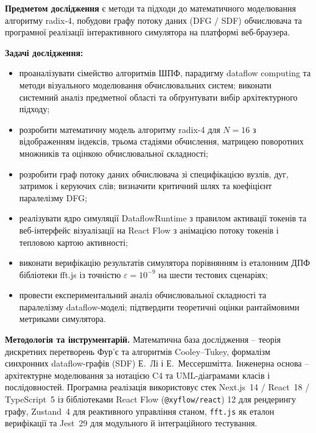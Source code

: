 \documentclass[
]{article}
\begin{document}
\textbf{Предметом дослідження} є методи та підходи до математичного
моделювання алгоритму radix-4, побудови графу потоку даних (DFG / SDF)
обчислювача та програмної реалізації інтерактивного симулятора на
платформі веб-браузера.

\textbf{Задачі дослідження:}

\begin{itemize}
\item
  проаналізувати сімейство алгоритмів ШПФ, парадигму dataflow computing
  та методи візуального моделювання обчислювальних систем; виконати
  системний аналіз предметної області та обґрунтувати вибір
  архітектурного підходу;
\item
  розробити математичну модель алгоритму radix-4 для \(N = 16\) з
  відображенням індексів, трьома стадіями обчислення, матрицею
  поворотних множників та оцінкою обчислювальної складності;
\item
  розробити граф потоку даних обчислювача зі специфікацією вузлів, дуг,
  затримок і керуючих слів; визначити критичний шлях та коефіцієнт
  паралелізму DFG;
\item
  реалізувати ядро симуляції DataflowRuntime з правилом активації
  токенів та веб-інтерфейс візуалізації на React Flow з анімацією потоку
  токенів і тепловою картою активності;
\item
  виконати верифікацію результатів симулятора порівнянням із еталонним
  ДПФ бібліотеки fft.js із точністю \(\varepsilon = 10^{- 9}\) на шести
  тестових сценаріях;
\item
  провести експериментальний аналіз обчислювальної складності та
  паралелізму dataflow-моделі; підтвердити теоретичні оцінки
  рантаймовими метриками симулятора.
\end{itemize}

\textbf{Методологія та інструментарій.} Математична база дослідження --
теорія дискретних перетворень Фур'є та алгоритмів Cooley--Tukey,
формалізм синхронних dataflow-графів (SDF) Е.~Лі і Е.~Мессершмітта.
Інженерна основа -- архітектурне моделювання за нотацією C4 та
UML-діаграмами класів і послідовностей. Програмна реалізація
використовує стек Next.js~14 / React~18 / TypeScript~5 із бібліотеками
React Flow (\texttt{@xyflow/react}) 12 для рендерингу графу, Zustand~4
для реактивного управління станом, \texttt{fft.js} як еталон верифікації
та Jest~29 для модульного й інтеграційного тестування.
\end{document}
